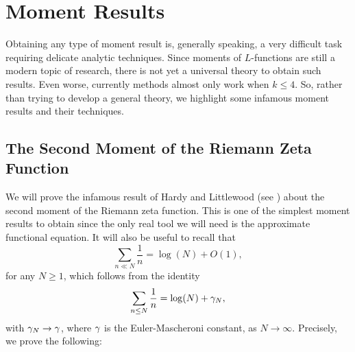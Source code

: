 \chapter{Moment Results}
  Obtaining any type of moment result is, generally speaking, a very difficult task requiring delicate analytic techniques. Since moments of $L$-functions are still a modern topic of research, there is not yet a universal theory to obtain such results. Even worse, currently methods almost only work when $k \le 4$. So, rather than trying to develop a general theory, we highlight some infamous moment results and their techniques.
  \section{The Second Moment of the Riemann Zeta Function}
    We will prove the infamous result of Hardy and Littlewood (see \cite{hardy1916contributions}) about the second moment of the Riemann zeta function. This is one of the simplest moment results to obtain since the only real tool we will need is the approximate functional equation. It will also be useful to recall that
    \begin{equation}\label{equ:approximation_for_harmonic_sums}
      \sum_{n \ll N}\frac{1}{n} = \log(N)+O(1),
    \end{equation}
    for any $N \ge 1$, which follows from the identity
    \[
      \sum_{n \le N}\frac{1}{n} = \log(N)+\gamma_{N},
    \]
    with $\gamma_{N} \to \gamma$, where $\gamma$ is the Euler-Mascheroni constant, as $N \to \infty$. Precisely, we prove the following:

